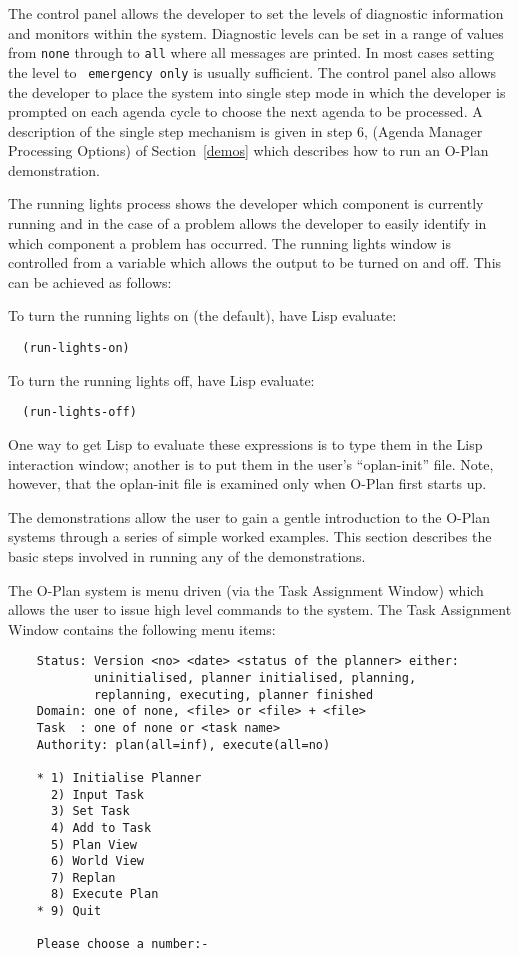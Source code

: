 The control panel allows the developer to set the levels of diagnostic
information and monitors within the system. Diagnostic levels can be
set in a range of values from {\tt none} through to {\tt all} where
all messages are printed. In most cases setting the level to {\tt
emergency only} is usually sufficient. The control panel also allows
the developer to place the system into single step mode in which the
developer is prompted on each agenda cycle to choose the next agenda
to be processed. A description of the single step mechanism is given
in step 6, (Agenda Manager Processing Options) of Section~\ref{demos}
which describes how to run an O-Plan demonstration.

The running lights process shows the developer which component is
currently running and in the case of a problem allows the developer to
easily identify in which component a problem has occurred. The running
lights window is controlled from a variable which allows the output to
be turned on and off. This can be achieved as follows:

To turn the running lights on (the default), have Lisp evaluate:

\begin{verbatim} 
  (run-lights-on)
\end{verbatim}

To turn the running lights off, have Lisp evaluate:

\begin{verbatim} 
  (run-lights-off)
\end{verbatim}

One way to get Lisp to evaluate these expressions is to type them in
the Lisp interaction window; another is to put them in the user's
``oplan-init'' file.  Note, however, that the oplan-init file is
examined only when O-Plan first starts up.

The demonstrations allow the user to gain a gentle introduction to the
O-Plan systems through a series of simple worked examples. This
section describes the basic steps involved in running any of the
demonstrations.

The O-Plan system is menu driven (via the Task Assignment Window) which
allows the user to issue high level commands to the system. The Task
Assignment Window contains the following menu items:

\begin{verbatim}
    Status: Version <no> <date> <status of the planner> either:
            uninitialised, planner initialised, planning, 
            replanning, executing, planner finished
    Domain: one of none, <file> or <file> + <file>
    Task  : one of none or <task name>
    Authority: plan(all=inf), execute(all=no)

    * 1) Initialise Planner
      2) Input Task 
      3) Set Task
      4) Add to Task
      5) Plan View
      6) World View
      7) Replan
      8) Execute Plan
    * 9) Quit

    Please choose a number:- 
\end{verbatim}

